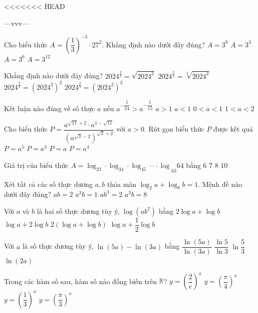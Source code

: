 <<<<<<< HEAD
\begin{name}
	{\tenchude}{\tendethi}{---vvv---}{\thoigian}
\end{name}
\setcounter{ex}{0}\setcounter{bt}{0}
\begin{ex}
Cho biểu thức $A=\left(\dfrac{1}{3}\right)^{-3} \cdot 27^2$. Khẳng định nào dưới đây đúng?
\choice
{$A=3^9$}
{$A=3^3$}
{$A=3^6$}
{$A={3^{12}}$}
\end{ex}
\begin{ex}
Khẳng định nào dưới đây đúng?
\choice
{${{2024}^{\tfrac{2}{3}}}=\sqrt{{{2024}^3}}$}
{${{2024}^{\tfrac{2}{3}}}=\sqrt[3]{{{2024}^2}}$}
{${{2024}^{\tfrac{2}{3}}}={{\left({{2024}^3}\right)}^2}$}
{${{2024}^{\tfrac{2}{3}}}={{\left({{2024}^2}\right)}^3}$}
\end{ex}
\begin{ex}
Kết luận nào đúng về số thực $a$ nếu ${a^{-\dfrac{1}{24}}}>{a^{-\dfrac{1}{15}}}$
\choice
{$a>1$}
{$a<1$}
{$0<a<1$}
{$1<a<2$}
\end{ex}
\begin{ex}
Cho biểu thức $P=\dfrac{{a^{\sqrt{11}+2}} \cdot {a^{1-\sqrt{11}}}}{{{\left({a^{\sqrt{3}-2}}\right)}^{\sqrt{3}+2}}}$ với $a>0$. Rút gọn biểu thức $P$ được kết quả
\choice
{$P=a^5$}
{$P=a^3$}
{$P=a$}
{$P=a^4$}
\end{ex}
\begin{ex}
Giá trị của biểu thức $A={{\log _23 \cdot \log _34 \cdot \log _45 \cdot \cdot \cdot \log }_{63}}64$ bằng
\choice
{$6$}
{$7$}
{$8$}
{$10$}
\end{ex}
\begin{ex}
Xét tất cả các số thực dương $a,b$ thỏa mãn $\log _2a+\log _8b=1$. Mệnh đề nào dưới đây đúng?
\choice
{$ab=2$}
{$a^3b=1$}
{$ab^3=2$}
{$a^3b=8$}
\end{ex}
\begin{ex}
Với $a$ và $b$ là hai số thực dương tùy ý, $\log \left(ab^2\right)$ bằng
\choice
{$2\log a+\log b$}
{$\log a+2\log b$}
{$2\left(\log a+\log b\right)$}
{$\log a+\dfrac{1}{2}\log b$}
\end{ex}
\begin{ex}
Với $a$ là số thực dương tùy ý, $\ln (5a)-\ln (3a)$ bằng
\choice
{$\dfrac{\ln (5a)}{\ln (3a)}$}
{$\dfrac{\ln 5}{\ln 3}$}
{$\ln \dfrac{5}{3}$}
{$\ln (2a)$}
\end{ex}
\begin{ex}
Trong các hàm số sau, hàm số nào đồng biến trên $\mathbb{R}$?
\choice
{$y=\left(\dfrac{2}{e}\right)^x$}
{$y={{\left(\dfrac{\pi }{4}\right)}^x}$}
{$y={{\left(\dfrac{1}{3}\right)}^x}$}
{$y={{\left(\dfrac{\pi }{3}\right)}^x}$}
\end{ex}
